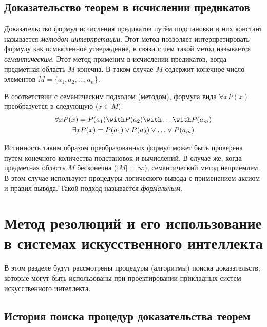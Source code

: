 
\subsection{Доказательство теорем в исчислении предикатов}

Доказательство формул исчисления предикатов путём подстановки в них
констант называется \emph{методом интерпретации}. Этот метод позволяет
интерпретировать формулу как осмысленное утверждение, в связи с чем
такой метод называется \emph{семантическим}. Этот метод применим в
исчислении предикатов, вогда предметная область $M$ конечна. В таком
случае $M$ содержит конечное число элементов $M =
\{a_1,a_2,\ldots,a_n\}$.

В соответствии с семаническим подходом (методом), формула вида
$\forall{x}P(x)$ преобразуется в следующую ($x \in M$):
\begin{gather*} \forall{x}P(x) = P(a_1) \with P(a_2) \with \ldots
\with P(a_m)\\ \exists{x}P(x) = P(a_1) \lor P(a_2) \lor \ldots \lor
P(a_m)
\end{gather*}

Истинность таким образом преобразованных формул может быть проверена
путем конечного количества подстановок и вычислений. В случае же,
когда предметная область $M$ бесконечна ($|M| = \infty$),
семантический метод неприемлем. В этом случае используют процедуры
логического вывода с применением аксиом и правил вывода. Такой подход
называется \emph{формальным}.


\section{Метод резолюций и его использование в системах искусственного
интеллекта}

В этом разделе будут рассмотрены процедуры (алгоритмы) поиска
доказательств, которые могут быть использованы при проектировании
прикладных систем искусственного интеллекта.


\subsection{История поиска процедур доказательства теорем}

